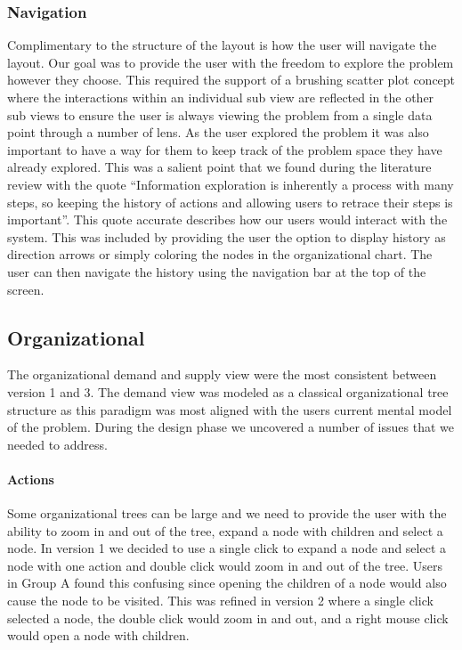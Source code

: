 \documentclass[journal]{vgtc}                %
\begin{document}
\subsubsection{Navigation}
Complimentary to the structure of the layout is how the user will navigate the layout.  Our goal was to provide the user with the freedom to explore the problem however they choose.  This required the support of a brushing scatter plot concept where the interactions within an individual sub view are reflected in the other sub views to ensure the user is always viewing the problem from a single data point through a number of lens.
As the user explored the problem it was also important to have a way for them to keep track of the problem space they have already explored.  This was a salient point that we found during the literature review with the quote ``Information exploration is inherently a process with many steps, so keeping the history of actions and allowing users to retrace their steps is important''\cite{anafigueiras}.  This quote accurate describes how our users would interact with the system.  This was included by providing the user the option to display history as direction arrows or simply coloring the nodes in the organizational chart.  The user can then navigate the history using the navigation bar at the top of the screen.

\subsection{Organizational}
The organizational demand and supply view were the most consistent between version 1 and 3.  The demand view was modeled as a classical organizational tree structure as this paradigm was most aligned with the users current mental model of the problem.  During the design phase we uncovered a number of issues that we needed to address.

\paragraph{Actions}
Some organizational trees can be large and we need to provide the user with the ability to zoom in and out of the tree, expand a node with children and select a node.  In version 1 we decided to use a single click to expand a node and select a node with one action and double click would zoom in and out of the tree.  Users in Group A found this confusing since opening the children of a node would also cause the node to be visited.  This was refined in version 2 where a single click selected a node, the double click would zoom in and out, and a right mouse click would open a node with children.
\end{document}
